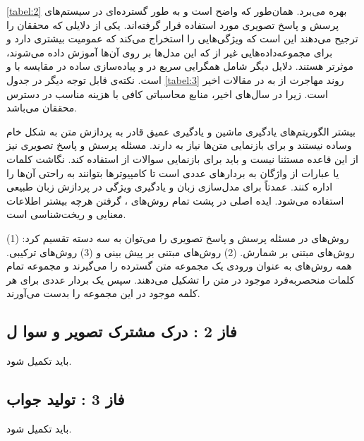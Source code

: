 {{		\ref{tabel:2}
		بهره می‌برد. همان‌طور که واضح است 
		و
		به طور گسترده‌ای در سیستم‌های پرسش و پاسخ تصویری مورد استفاده قرار گرفته‌اند. یکی از دلایلی که محققان
		 را ترجیح می‌دهند این است که ویژگی‌هایی را استخراج می‌کند که عمومیت بیشتری دارد و برای مجموعه‌داده‌هایی غیر از
		که این مدل‌ها بر روی آن‌ها آموزش داده می‌شوند، موثرتر هستند. دلایل دیگر شامل همگرایی سریع در
		و پیاده‌سازی ساده در مقایسه با
		و
		است. نکته‌ی قابل توجه دیگر در جدول 
		\ref{tabel:3}
		روند مهاجرت از 
		به
		در مقالات اخیر است. زیرا در سال‌های اخیر، منابع محاسباتی کافی با هزینه مناسب در دسترس محققان می‌باشد.
		
		بیشتر الگوریتم‌های یادگیری ماشین و یادگیری عمیق  قادر به پردازش متن به شکل خام وساده نیستند  و برای بازنمایی متن‌ها نیاز به 
		دارند. مسئله پرسش و پاسخ تصویری نیز از این قاعده مستثنا نیست و باید برای بازنمایی سوالات از 
		استفاده کند.
	 نگاشت کلمات یا عبارات از واژگان به بردارهای عددی است تا کامپیوترها بتوانند به راحتی آن‌ها را اداره کنند. 
	 عمدتاً برای مدل‌سازی زبان و یادگیری ویژگی در پردازش زبان طبیعی استفاده می‌شود. ایده اصلی در پشت تمام روش‌های
	 ، گرفتن هرچه بیشتر اطلاعات معنایی و ریخت‌شناسی است. 
	 
	 روش‌های 
	 در مسئله پرسش و پاسخ تصویری را می‌توان به سه دسته تقسیم کرد: (1) روش‌های مبتنی بر شمارش. (2) روش‌های مبتنی بر پیش بینی و (3) روش‌های ترکیبی. همه روش‌های 
	  به عنوان ورودی یک مجموعه متن گسترده را می‌گیرند و  مجموعه تمام کلمات منحصربه‌فرد موجود در متن را تشکیل می‌دهند. سپس یک بردار عددی برای هر کلمه موجود در این مجموعه را بدست می‌آورند.
		
		
		
	
	}
\subsection{فاز 2 : درک مشترک تصویر و سوا ل}
باید تکمیل شود.
\subsection{فاز 3 : تولید جواب}
باید تکمیل شود.
}

